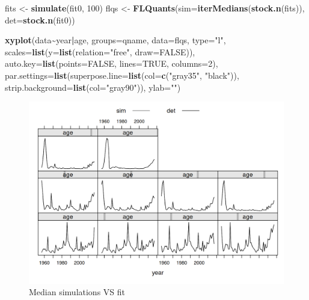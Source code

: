 \documentclass[
]{book}
\newenvironment{Shaded}{\begin{snugshade}}{\end{snugshade}}
\newcommand{\AttributeTok}[1]{\textcolor[rgb]{0.13,0.29,0.53}{#1}}
\newcommand{\ConstantTok}[1]{\textcolor[rgb]{0.56,0.35,0.01}{#1}}
\newcommand{\DecValTok}[1]{\textcolor[rgb]{0.00,0.00,0.81}{#1}}
\newcommand{\FunctionTok}[1]{\textcolor[rgb]{0.13,0.29,0.53}{\textbf{#1}}}
\newcommand{\NormalTok}[1]{#1}
\newcommand{\OtherTok}[1]{\textcolor[rgb]{0.56,0.35,0.01}{#1}}
\newcommand{\SpecialCharTok}[1]{\textcolor[rgb]{0.81,0.36,0.00}{\textbf{#1}}}
\newcommand{\StringTok}[1]{\textcolor[rgb]{0.31,0.60,0.02}{#1}}
\begin{document}
\begin{Shaded}
\begin{Highlighting}[]
\NormalTok{fits }\OtherTok{\textless{}{-}} \FunctionTok{simulate}\NormalTok{(fit0, }\DecValTok{100}\NormalTok{)}
\NormalTok{flqs }\OtherTok{\textless{}{-}} \FunctionTok{FLQuants}\NormalTok{(}\AttributeTok{sim=}\FunctionTok{iterMedians}\NormalTok{(}\FunctionTok{stock.n}\NormalTok{(fits)), }\AttributeTok{det=}\FunctionTok{stock.n}\NormalTok{(fit0))}
\end{Highlighting}
\end{Shaded}

\begin{Shaded}
\begin{Highlighting}[]
\FunctionTok{xyplot}\NormalTok{(data}\SpecialCharTok{\textasciitilde{}}\NormalTok{year}\SpecialCharTok{|}\NormalTok{age, }\AttributeTok{groups=}\NormalTok{qname, }\AttributeTok{data=}\NormalTok{flqs, }\AttributeTok{type=}\StringTok{"l"}\NormalTok{,}
       \AttributeTok{scales=}\FunctionTok{list}\NormalTok{(}\AttributeTok{y=}\FunctionTok{list}\NormalTok{(}\AttributeTok{relation=}\StringTok{"free"}\NormalTok{, }\AttributeTok{draw=}\ConstantTok{FALSE}\NormalTok{)),}
       \AttributeTok{auto.key=}\FunctionTok{list}\NormalTok{(}\AttributeTok{points=}\ConstantTok{FALSE}\NormalTok{, }\AttributeTok{lines=}\ConstantTok{TRUE}\NormalTok{, }\AttributeTok{columns=}\DecValTok{2}\NormalTok{),}
       \AttributeTok{par.settings=}\FunctionTok{list}\NormalTok{(}\AttributeTok{superpose.line=}\FunctionTok{list}\NormalTok{(}\AttributeTok{col=}\FunctionTok{c}\NormalTok{(}\StringTok{"gray35"}\NormalTok{, }\StringTok{"black"}\NormalTok{)),}
       \AttributeTok{strip.background=}\FunctionTok{list}\NormalTok{(}\AttributeTok{col=}\StringTok{"gray90"}\NormalTok{)), }\AttributeTok{ylab=}\StringTok{""}\NormalTok{)}
\end{Highlighting}
\end{Shaded}

\begin{figure}
\centering
\includegraphics{_bookdown_files/_main_files/figure-html/sim-1.png}
\caption{\label{fig:sim}Median simulations VS fit}
\end{figure}
\end{document}
